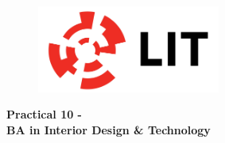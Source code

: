

\newpage
\setcounter{page}{1}
\begin{center}
	\begin{figure}[ht]
		\centering
		\includegraphics[width = 6cm]{img/LITlogo.jpg}
		\label{fig:logoa10}
	\end{figure}
	\Large\textbf{Practical 10 - }\\
	\large\textbf{BA in Interior Design \& Technology}
\end{center}		

